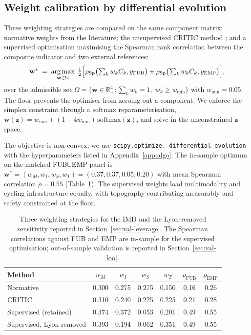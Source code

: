 \documentclass[11pt,a4paper]{article}
\DeclareMathOperator*{\argmax}{arg\,max}
\begin{document}
\subsection{Weight calibration by differential evolution}
\label{sec:calibration}

Three weighting strategies are compared on the same component
matrix: normative weights from the literature; the unsupervised
CRITIC method \citep{Diakoulaki1995}; and a supervised optimisation
maximising the Spearman rank correlation between the composite
indicator and two external references:
\begin{equation}
    \mathbf{w}^{\ast} \;=\;
    \argmax_{\mathbf{w}\in\Omega}\;
    \tfrac{1}{2}\Bigl[
        \rho_{\mathrm{Sp}}\bigl(\textstyle\sum_k w_k C_k,
                                 y_{\text{FUB}}\bigr)
        + \rho_{\mathrm{Sp}}\bigl(\textstyle\sum_k w_k C_k,
                                 y_{\text{EMP}}\bigr)
    \Bigr],
    \label{eq:objectif}
\end{equation}
over the admissible set
$\Omega = \{\mathbf{w} \in \mathbb{R}^{4}_{+} : \sum_k w_k = 1,
\; w_k \geq w_{\min}\}$ with $w_{\min} = 0.05$. The floor prevents
the optimiser from zeroing out a component. We enforce the
simplex constraint through a softmax reparameterisation,
$\mathbf{w}(\mathbf{z}) = w_{\min} + (1 - 4 w_{\min})\,
\mathrm{softmax}(\mathbf{z})$, and solve in the unconstrained
$\mathbf{z}$-space.

The objective is non-convex; we use \texttt{scipy.optimize.
differential\_evolution} \citep{Virtanen2020,Storn1997,Price2005}
with the hyperparameters listed in Appendix~\ref{app:algo}. The
in-sample optimum on the matched FUB$\cup$EMP panel is
$\mathbf{w}^{\ast} = (w_M, w_I, w_S, w_T) = (0.37, 0.37, 0.05, 0.20)$
with mean Spearman correlation $\bar\rho = 0.55$
(Table~\ref{tab:weights-comparison}). The supervised weights load
multimodality and cycling infrastructure equally, with topography
contributing measurably and safety constrained at the floor.

\begin{table}[H]
\centering
\caption{Three weighting strategies for the IMD and the
Lyon-removed sensitivity reported in
Section~\ref{sec:val-leverage}. The Spearman correlations against
FUB and EMP are in-sample for the supervised optimisation;
out-of-sample validation is reported in Section~\ref{sec:val-loo}.}
\label{tab:weights-comparison}
\small
\begin{tabular}{@{}lcccccc@{}}
\toprule
Method & $w_M$ & $w_I$ & $w_S$ & $w_T$ &
$\rho_{\text{FUB}}$ & $\rho_{\text{EMP}}$ \\
\midrule
Normative                       & 0.300 & 0.275 & 0.275 & 0.150 & 0.16 & 0.26 \\
CRITIC \citep{Diakoulaki1995}   & 0.310 & 0.240 & 0.225 & 0.225 & 0.21 & 0.28 \\
Supervised (retained)           & 0.374 & 0.372 & 0.053 & 0.201 & 0.49 & 0.55 \\
Supervised, Lyon-removed        & 0.393 & 0.194 & 0.062 & 0.351 & 0.49 & 0.55 \\
\bottomrule
\end{tabular}
\end{table}
\end{document}
